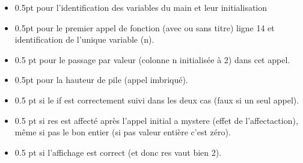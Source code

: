 \begin{correction}

  \begin{itemize}
  \item 0.5pt pour l'identification des variables du main et leur
    initialisation
  \item 0.5pt pour le premier appel de fonction (avec ou sans titre)
    ligne 14 et identification de l'unique variable (n).
  \item 0.5 pt pour le passage par valeur (colonne n initialisée à 2)
    dans cet appel.
  \item 0.5pt pour la hauteur de pile (appel imbriqué).
  \item 0.5 pt si le if est correctement suivi dans les deux cas (faux
    si un seul appel).
  \item 0.5 pt si res est affecté après l'appel initial a mystere
    (effet de l'affectaction), même si pas le bon entier (si pas
    valeur entière c'est zéro). 
  \item 0.5 pt si l'affichage est correct (et donc res vaut bien 2).
  \end{itemize}

\end{correction}
